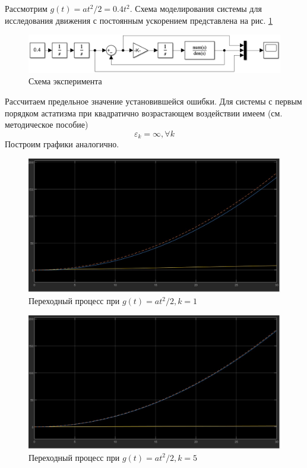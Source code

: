 \documentclass[a4paper, 12pt]{article}
\begin{document}
    Рассмотрим $g(t)=at^2/2=0.4t^2$. Схема моделирования системы для исследования движения
    с постоянным ускорением представлена на рис. \ref{fig:scheme2_3}
    \begin{figure}[H]
        \centering
        \includegraphics[scale=0.6]{scheme2_3.png}
        \captionsetup{skip=0pt}
        \caption{Схема эксперимента}
        \label{fig:scheme2_3}
    \end{figure}
    \noindent Рассчитаем предельное значение установившейся ошибки.
    Для системы с первым порядком астатизма при квадратично возрастающем воздействии имеем (см. методическое пособие)
    $$\varepsilon_k=\infty,\forall k$$
    Построим графики аналогично.
    \begin{figure}[H]
        \centering
        \includegraphics[scale=0.3]{task_2_g=at2_k=1.jpg}
        \captionsetup{skip=0pt}
        \caption{Переходный процесс при $g(t)=at^2/2,k=1$}
        \label{fig:t2gat2k1}
    \end{figure}
    \vspace{15mm}
    \begin{figure}[H]
        \centering
        \includegraphics[scale=0.3]{task_2_g=at2_k=5.jpg}
        \captionsetup{skip=0pt}
        \caption{Переходный процесс при $g(t)=at^2/2,k=5$}
        \label{fig:t2gat2k5}
    \end{figure}
\end{document}
